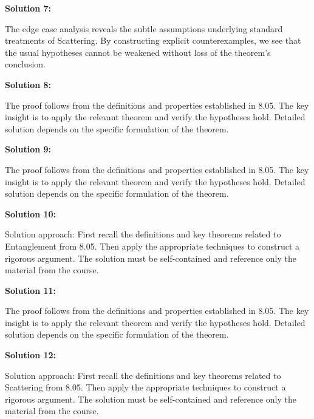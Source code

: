 \documentclass[12pt,a4paper]{exam}
\begin{document}
\vspace{0.5cm}

\textbf{Solution 7:}

The edge case analysis reveals the subtle assumptions underlying standard treatments of Scattering. By constructing explicit counterexamples, we see that the usual hypotheses cannot be weakened without loss of the theorem's conclusion.

\vspace{0.5cm}

\textbf{Solution 8:}

The proof follows from the definitions and properties established in 8.05. The key insight is to apply the relevant theorem and verify the hypotheses hold. Detailed solution depends on the specific formulation of the theorem.

\vspace{0.5cm}

\textbf{Solution 9:}

The proof follows from the definitions and properties established in 8.05. The key insight is to apply the relevant theorem and verify the hypotheses hold. Detailed solution depends on the specific formulation of the theorem.

\vspace{0.5cm}

\textbf{Solution 10:}

Solution approach: First recall the definitions and key theorems related to Entanglement from 8.05. Then apply the appropriate techniques to construct a rigorous argument. The solution must be self-contained and reference only the material from the course.

\vspace{0.5cm}

\textbf{Solution 11:}

The proof follows from the definitions and properties established in 8.05. The key insight is to apply the relevant theorem and verify the hypotheses hold. Detailed solution depends on the specific formulation of the theorem.

\vspace{0.5cm}

\textbf{Solution 12:}

Solution approach: First recall the definitions and key theorems related to Scattering from 8.05. Then apply the appropriate techniques to construct a rigorous argument. The solution must be self-contained and reference only the material from the course.
\end{document}
